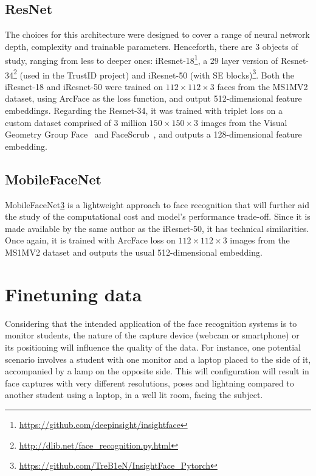 \documentclass[class=report, crop=false, a4paper, 12pt]{standalone}
\begin{document}
\subsection{ResNet}
The choices for this architecture were designed to cover a range of neural network depth, complexity and trainable parameters. Henceforth, there are 3 objects of study, ranging from less to deeper ones: iResnet-18\footnote{\url{https://github.com/deepinsight/insightface}}, a 29 layer version of Resnet-34\footnote{\url{http://dlib.net/face_recognition.py.html}} (used in the TrustID project) and iResnet-50 (with \acrshort{SE} blocks)\footnote{\label{fnote6}\url{https://github.com/TreB1eN/InsightFace_Pytorch}}. Both the iResnet-18 and iResnet-50 were trained on $112\times112\times3$ faces from the MS1MV2 dataset, using ArcFace as the loss function, and output 512-dimensional feature embeddings. Regarding the Resnet-34, it was trained with triplet loss on a custom dataset comprised of 3 million $150\times150\times3$ images from the Visual Geometry Group
Face~\autocite{parkhiDeepFaceRecognition2015} and FaceScrub~\autocite{ngDatadrivenApproachCleaning2014}, and outputs a 128-dimensional feature embedding.

\subsection{MobileFaceNet}
MobileFaceNet\cref{fnote6} is a lightweight approach to face recognition that will further aid the study of the computational cost and model's performance trade-off. Since it is made available by the same author as the iResnet-50, it has technical similarities. Once again, it is trained with ArcFace loss on $112\times112\times3$ images from the MS1MV2 dataset and outputs the usual 512-dimensional embedding.


\section{Finetuning data}
Considering that the intended application of the face recognition systems is to monitor students, the nature of the capture device (webcam or smartphone) or its positioning will influence the quality of the data. For instance, one potential scenario involves a student with one monitor and a laptop placed to the side of it, accompanied by a lamp on the opposite side. This will configuration will result in face captures with very different resolutions, poses and lightning compared to another student using a laptop, in a well lit room, facing the subject. 
\end{document}
